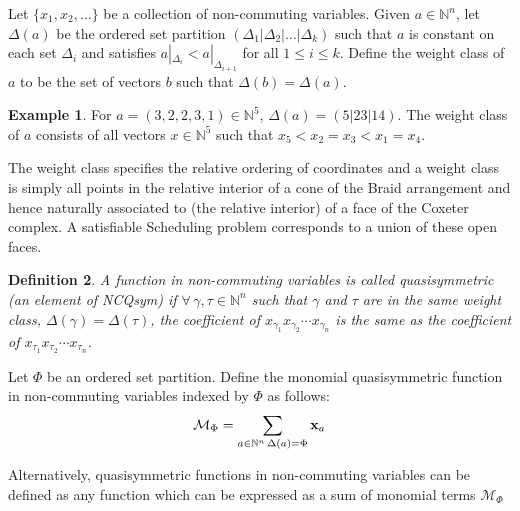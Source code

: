 \documentclass[12pt,reqno]{amsart}
\newtheorem{definition}{Definition}
\numberwithin{definition}{section}
\theoremstyle{definition}
\newtheorem{example}[definition]{Example}
\newcommand{\ncM}{\mathcal{M}}
\begin{document}
Let $\{x_1, x_2, \ldots \}$ be a collection of non-commuting
variables.  Given $a \in \mathbb{N}^n$, let $\Delta(a)$
be the ordered set partition $(\Delta_1 | \Delta_2 | \ldots | \Delta_k)$ such that 
$a$ is constant on each set $\Delta_i$
and satisfies $a|_{\Delta_i} < a|_{\Delta_{i+1}}$ for all $1 \leq i \leq k$. 
Define the weight class of $a$ to be the set of vectors $b$
such that $\Delta(b) = \Delta(a)$.  

\begin{example}
For $a = (3,2,2,3,1) \in \mathbb{N}^5$, $\Delta(a) =
(5|23|14)$.  The weight class of $a$ consists of all vectors $x
\in \mathbb{N}^5$ such that $x_5 < x_2 = x_3 < x_1 = x_4$. 
\end{example}


The weight class specifies the relative ordering of coordinates and a
weight class is simply all points in the relative interior of a cone
of the Braid arrangement and hence naturally associated to (the relative interior) of a face of
the Coxeter complex.  A satisfiable Scheduling problem corresponds to a union of these open faces.   


\begin{definition}
A function in non-commuting variables is called quasisymmetric (an element of NCQsym) if
$\forall \, \gamma, \tau \in \mathbb{N}^n$ such that $\gamma$ and $\tau$
are in the same weight class, $\Delta(\gamma) =
\Delta(\tau)$, the coefficient of $x_{\gamma_1}x_{\gamma_2} \cdots
x_{\gamma_n}$ is the same as the coefficient of $x_{\tau_1}x_{\tau_2} \cdots x_{\tau_n}$.
\end{definition}

Let $\Phi$ be an ordered set partition.  Define the monomial quasisymmetric function in non-commuting variables indexed by $\Phi$ as follows:
$$\ncM_{\Phi} = \sum_{a \in \mathbb{N}^n \, \Delta(a) = \Phi} {\bf{x}}_{a}$$

Alternatively, quasisymmetric functions in non-commuting variables can be defined as any function which can be expressed as a sum of monomial terms $\ncM_{\Phi}$
\end{document}
